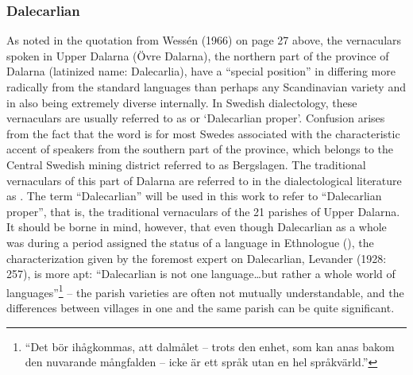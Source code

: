 \subsubsection[Dalecarlian]{\rmfamily Dalecarlian}
As noted in the quotation from Wessén (1966) on page 27 above, the vernaculars spoken in Upper Dalarna (Övre Dalarna), the northern part of the province of Dalarna (latinized name: Dalecarlia), have a “special position” in differing more radically from the standard languages than perhaps any Scandinavian variety and in also being extremely diverse internally. In Swedish dialectology, these vernaculars are usually referred to as  or ‘Dalecarlian proper’. Confusion arises from the fact that the word  is for most Swedes associated with the characteristic accent of speakers from the southern part of the province, which belongs to the Central Swedish mining district referred to as Bergslagen. The traditional vernaculars of this part of Dalarna are referred to in the dialectological literature as . The term “Dalecarlian” will be used in this work to refer to “Dalecarlian proper”, that is, the traditional vernaculars of the 21 parishes of Upper Dalarna. It should be borne in mind, however, that even though Dalecarlian as a whole was during a period  assigned the status of a language in Ethnologue (\href{http://www.ethnologue.com}{}), the characterization given by the foremost expert on Dalecarlian, Levander (1928: 257), is more apt: “Dalecarlian is not one language…but rather a whole world of languages”\footnote{\textsuperscript{ }“Det bör ihågkommas, att dalmålet – trots den enhet, som kan anas bakom den nuvarande mångfalden – icke är ett språk utan en hel språkvärld.”} – the parish varieties are often not mutually understandable, and the differences between villages in one and the same parish can be quite significant. 

